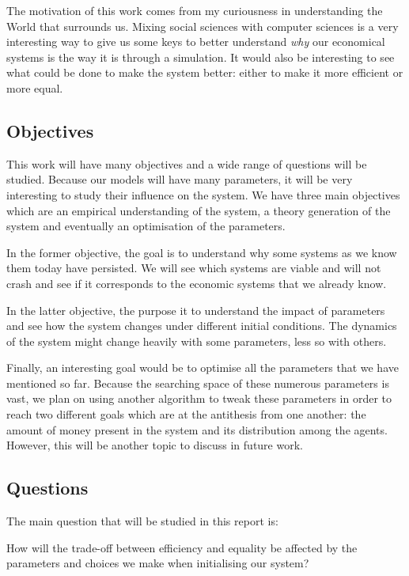 \documentclass[20pt]{article}
\begin{document}
The motivation of this work comes from my curiousness in understanding the World that surrounds us. Mixing social sciences with computer sciences is a very interesting way to give us some keys to better understand \emph{why} our economical systems is the way it is through a simulation. It would also be interesting to see what could be done to make the system better: either to make it more efficient or more equal.

\subsection{Objectives}

This work will have many objectives and a wide range of questions will be studied. Because our models will have many parameters, it will be very interesting to study their influence on the system. We have three main objectives which are an empirical understanding of the system, a theory generation of the system \cite{tesfatsion_handbook} and eventually an optimisation of the parameters.

In the former objective, the goal is to understand why some systems as we know them today have persisted. We will see which systems are viable and will not crash and see if it corresponds to the economic systems that we already know.

In the latter objective, the purpose it to understand the impact of parameters and see how the system changes under different initial conditions. The dynamics of the system might change heavily with some parameters, less so with others.

Finally, an interesting goal would be to optimise all the parameters that we have mentioned so far. Because the searching space of these numerous parameters is vast, we plan on using another algorithm to tweak these parameters in order to reach two different goals which are at the antithesis from one another: the amount of money present in the system and its distribution among the agents. However, this will be another topic to discuss in future work.

\subsection{Questions}

The main question that will be studied in this report is:

\vspace*{0.5cm}

\begin{center}
    How will the trade-off between efficiency and equality be affected by the parameters and choices we make when initialising our system?
\end{center}
\end{document}
